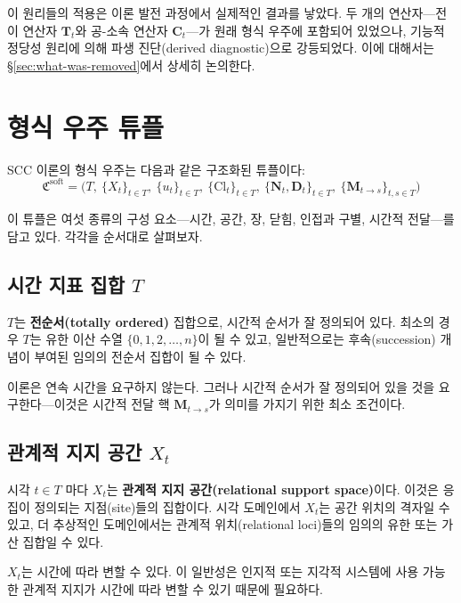 이 원리들의 적용은 이론 발전 과정에서 실제적인 결과를 낳았다. 두 개의 연산자---전이 연산자 $\mathbf{T}_t$와 공-소속 연산자 $\mathbf{C}_t$---가 원래 형식 우주에 포함되어 있었으나, 기능적 정당성 원리에 의해 파생 진단(derived diagnostic)으로 강등되었다. 이에 대해서는 \S\ref{sec:what-was-removed}에서 상세히 논의한다.


\section{형식 우주 튜플}
\label{sec:formal-universe-tuple}

SCC 이론의 형식 우주는 다음과 같은 구조화된 튜플이다:
\begin{equation}
    \mathfrak{C}^{\mathrm{soft}} = \Big( T,\ \{X_t\}_{t \in T},\ \{u_t\}_{t \in T},\ \{\mathrm{Cl}_t\}_{t \in T},\ \{\mathbf{N}_t, \mathbf{D}_t\}_{t \in T},\ \{\mathbf{M}_{t \to s}\}_{t,s \in T} \Big)
    \label{eq:formal-universe-ch3}
\end{equation}

이 튜플은 여섯 종류의 구성 요소---시간, 공간, 장, 닫힘, 인접과 구별, 시간적 전달---를 담고 있다. 각각을 순서대로 살펴보자.


\subsection{시간 지표 집합 $T$}

$T$는 \textbf{전순서(totally ordered)} 집합으로, 시간적 순서가 잘 정의되어 있다. 최소의 경우 $T$는 유한 이산 수열 $\{0, 1, 2, \ldots, n\}$이 될 수 있고, 일반적으로는 후속(succession) 개념이 부여된 임의의 전순서 집합이 될 수 있다.

이론은 연속 시간을 요구하지 않는다. 그러나 시간적 순서가 잘 정의되어 있을 것을 요구한다---이것은 시간적 전달 핵 $\mathbf{M}_{t \to s}$가 의미를 가지기 위한 최소 조건이다.


\subsection{관계적 지지 공간 $X_t$}

시각 $t \in T$ 마다 $X_t$는 \textbf{관계적 지지 공간(relational support space)}이다. 이것은 응집이 정의되는 지점(site)들의 집합이다. 시각 도메인에서 $X_t$는 공간 위치의 격자일 수 있고, 더 추상적인 도메인에서는 관계적 위치(relational loci)들의 임의의 유한 또는 가산 집합일 수 있다.

$X_t$는 시간에 따라 변할 수 있다. 이 일반성은 인지적 또는 지각적 시스템에 사용 가능한 관계적 지지가 시간에 따라 변할 수 있기 때문에 필요하다.

